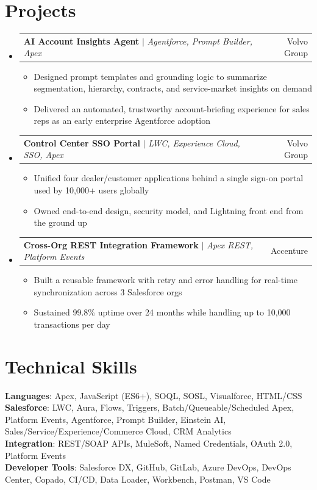 \documentclass[letterpaper,11pt]{article}
\makeatletter
\newcommand{\resumeItem}[1]{
  \item\small{
    {#1 \vspace{-2pt}}
  }
}
\newcommand{\resumeProjectHeading}[2]{
    \item
    \begin{tabular*}{0.97\textwidth}{l@{\extracolsep{\fill}}r}
      \small#1 & #2 \\
    \end{tabular*}\vspace{-7pt}
}
\newcommand{\resumeSubHeadingListStart}{\begin{itemize}[leftmargin=0.15in, label={}]}
\newcommand{\resumeSubHeadingListEnd}{\end{itemize}}
\newcommand{\resumeItemListStart}{\begin{itemize}}
\newcommand{\resumeItemListEnd}{\end{itemize}\vspace{-5pt}}
\makeatother
\begin{document}
\section{Projects}
    \resumeSubHeadingListStart
      \resumeProjectHeading
          {\textbf{AI Account Insights Agent} $|$ \emph{Agentforce, Prompt Builder, Apex}}{Volvo Group}
          \resumeItemListStart
            \resumeItem{Designed prompt templates and grounding logic to summarize segmentation, hierarchy, contracts, and service-market insights on demand}
            \resumeItem{Delivered an automated, trustworthy account-briefing experience for sales reps as an early enterprise Agentforce adoption}
          \resumeItemListEnd
      \resumeProjectHeading
          {\textbf{Control Center SSO Portal} $|$ \emph{LWC, Experience Cloud, SSO, Apex}}{Volvo Group}
          \resumeItemListStart
            \resumeItem{Unified four dealer/customer applications behind a single sign-on portal used by 10,000+ users globally}
            \resumeItem{Owned end-to-end design, security model, and Lightning front end from the ground up}
          \resumeItemListEnd
      \resumeProjectHeading
          {\textbf{Cross-Org REST Integration Framework} $|$ \emph{Apex REST, Platform Events}}{Accenture}
          \resumeItemListStart
            \resumeItem{Built a reusable framework with retry and error handling for real-time synchronization across 3 Salesforce orgs}
            \resumeItem{Sustained 99.8\% uptime over 24 months while handling up to 10,000 transactions per day}
          \resumeItemListEnd
    \resumeSubHeadingListEnd

\section{Technical Skills}
 \begin{itemize}[leftmargin=0.15in, label={}]
    \small{\item{
     \textbf{Languages}{: Apex, JavaScript (ES6+), SOQL, SOSL, Visualforce, HTML/CSS} \\
     \textbf{Salesforce}{: LWC, Aura, Flows, Triggers, Batch/Queueable/Scheduled Apex, Platform Events, Agentforce, Prompt Builder, Einstein AI, Sales/Service/Experience/Commerce Cloud, CRM Analytics} \\
     \textbf{Integration}{: REST/SOAP APIs, MuleSoft, Named Credentials, OAuth 2.0, Platform Events} \\
     \textbf{Developer Tools}{: Salesforce DX, GitHub, GitLab, Azure DevOps, DevOps Center, Copado, CI/CD, Data Loader, Workbench, Postman, VS Code}
    }}
 \end{itemize}
\end{document}
